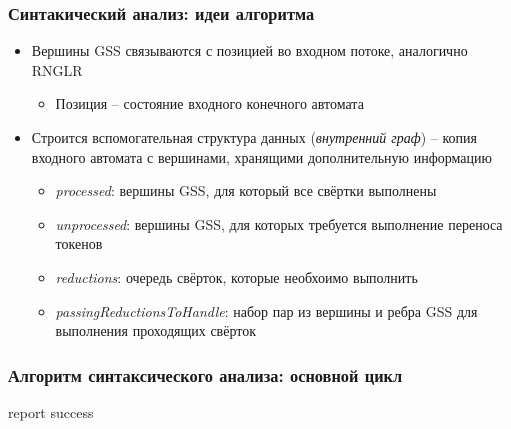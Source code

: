 \documentclass{beamer}
\begin{document}
\begin{frame}
    \transwipe[direction=90]
    \frametitle{Синтакический анализ: идеи алгоритма}
    \begin{itemize}
    \item Вершины GSS связываются с позицией во входном потоке, аналогично RNGLR
        \begin{itemize}
        \item Позиция -- состояние входного конечного автомата        
        \end{itemize}    
    \item Строится вспомогательная структура данных (\emph{внутренний граф}) -- копия входного автомата с вершинами, хранящими дополнительную информацию
        \begin{itemize}
        \item \emph{processed}: вершины GSS, для который все свёртки выполнены 
        \item \emph{unprocessed}: вершины GSS, для которых требуется выполнение переноса токенов
        \item \emph{reductions}: очередь свёрток, которые необхоимо выполнить
        \item \emph{passingReductionsToHandle}: набор пар из вершины и ребра GSS для выполнения проходящих свёрток
        \end{itemize}
    \end{itemize}
\end{frame}

\begin{frame}[fragile] 
    \transwipe[direction=90]
    \frametitle{Алгоритм синтаксического анализа: основной цикл}
\begin{algorithmic}[1]
  \EndWhile
   {report success}
  \EndIf
\EndFunction
\end{algorithmic}
\end{frame}
\end{document}
